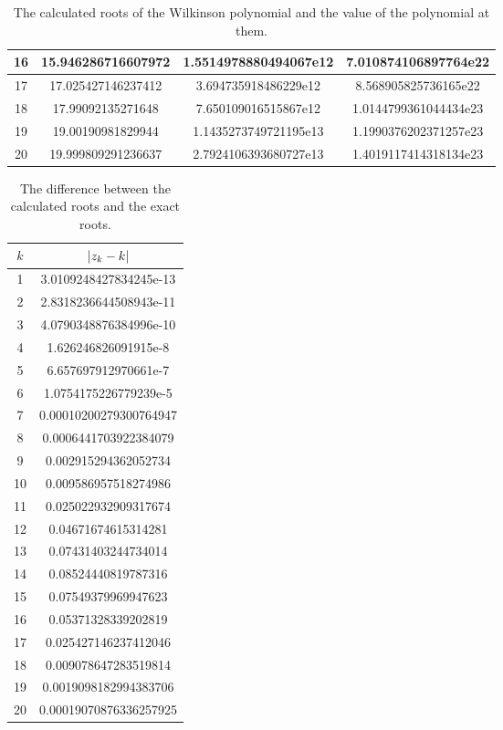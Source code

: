 \documentclass[a4paper, 12pt]{article}
\DeclarePairedDelimiter\abs{\lvert}{\rvert}
\begin{document}
\begin{table}[H]
\begin{tabular}{@{}cccc@{}}
16  & 15.946286716607972 & 1.5514978880494067e12 & 7.010874106897764e22 \\ \midrule
17  & 17.025427146237412 & 3.694735918486229e12  & 8.568905825736165e22 \\ \midrule
18  & 17.99092135271648  & 7.650109016515867e12  & 1.0144799361044434e23 \\ \midrule
19  & 19.00190981829944  & 1.1435273749721195e13 & 1.1990376202371257e23 \\ \midrule
20  & 19.999809291236637 & 2.7924106393680727e13 & 1.4019117414318134e23 \\ \bottomrule
\end{tabular}
\caption{The calculated roots of the Wilkinson polynomial and the value of the polynomial at them.}
\label{tab:wilk_roots}
\end{table}

\begin{table}[H]
\centering
\begin{tabular}{@{}cc@{}}
\toprule
$k$ & $\abs{z_k - k}$ \\ \midrule
1   & 3.0109248427834245e-13 \\ \midrule
2   & 2.8318236644508943e-11 \\ \midrule
3   & 4.0790348876384996e-10 \\ \midrule
4   & 1.626246826091915e-8 \\ \midrule
5   & 6.657697912970661e-7 \\ \midrule
6   & 1.0754175226779239e-5 \\ \midrule
7   & 0.00010200279300764947 \\ \midrule
8   & 0.0006441703922384079 \\ \midrule
9   & 0.002915294362052734 \\ \midrule
10  & 0.009586957518274986 \\ \midrule
11  & 0.025022932909317674 \\ \midrule
12  & 0.04671674615314281 \\ \midrule
13  & 0.07431403244734014 \\ \midrule
14  & 0.08524440819787316 \\ \midrule
15  & 0.07549379969947623 \\ \midrule
16  & 0.05371328339202819 \\ \midrule
17  & 0.025427146237412046 \\ \midrule
18  & 0.009078647283519814 \\ \midrule
19  & 0.0019098182994383706 \\ \midrule
20  & 0.00019070876336257925 \\ \bottomrule
\end{tabular}
\caption{The difference between the calculated roots and the exact roots.}
\label{tab:wilk_root_diff}
\end{table}
\end{document}
